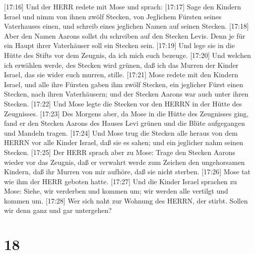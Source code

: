  {[}17:16{]} Und der HERR redete mit Mose und sprach:
 {[}17:17{]} Sage den Kindern Israel und nimm von ihnen
zwölf Stecken, von Jeglichem Fürsten seines Vaterhauses einen, und
schreib eines jeglichen Namen auf seinen Stecken. 
{[}17:18{]} Aber den Namen Aarons sollst du schreiben auf den Stecken
Levis. Denn je für ein Haupt ihrer Vaterhäuser soll ein Stecken sein.
 {[}17:19{]} Und lege sie in die Hütte des Stifts vor dem
Zeugnis, da ich mich euch bezeuge.  {[}17:20{]} Und welchen
ich erwählen werde, des Stecken wird grünen, daß ich das Murren der
Kinder Israel, das sie wider euch murren, stille. 
{[}17:21{]} Mose redete mit den Kindern Israel, und alle ihre Fürsten
gaben ihm zwölf Stecken, ein jeglicher Fürst einen Stecken, nach ihren
Vaterhäusern; und der Stecken Aarons war auch unter ihren Stecken.
 {[}17:22{]} Und Mose legte die Stecken vor den HERRN in der
Hütte des Zeugnisses.  {[}17:23{]} Des Morgens aber, da Mose
in die Hütte des Zeugnisses ging, fand er den Stecken Aarons des Hauses
Levi grünen und die Blüte aufgegangen und Mandeln tragen. 
{[}17:24{]} Und Mose trug die Stecken alle heraus von dem HERRN vor alle
Kinder Israel, daß sie es sahen; und ein jeglicher nahm seinen Stecken.
 {[}17:25{]} Der HERR sprach aber zu Mose: Trage den
Stecken Aarons wieder vor das Zeugnis, daß er verwahrt werde zum Zeichen
den ungehorsamen Kindern, daß ihr Murren von mir aufhöre, daß sie nicht
sterben.  {[}17:26{]} Mose tat wie ihm der HERR geboten
hatte.  {[}17:27{]} Und die Kinder Israel sprachen zu Mose:
Siehe, wir verderben und kommen um; wir werden alle vertilgt und kommen
um.  {[}17:28{]} Wer sich naht zur Wohnung des HERRN, der
stirbt. Sollen wir denn ganz und gar untergehen?

\hypertarget{section-17}{%
\section{18}\label{section-17}}

